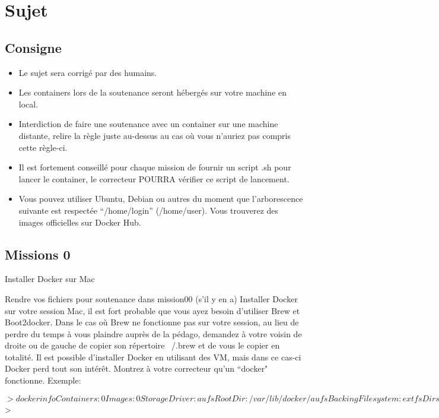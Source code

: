 \documentclass{42}
\begin{document}
\newpage

\chapter{Sujet}
\section{Consigne}
\begin{itemize}
	\item Le sujet sera corrigé par des humains.
	\item Les containers lors de la soutenance seront hébergés sur votre machine en local.
	\item Interdiction de faire une soutenance avec un container sur une machine distante, relire la règle juste au-dessus au cas où vous n’auriez pas compris cette règle-ci.
	\item Il est fortement conseillé pour chaque mission de fournir un script .sh pour lancer le container, le correcteur POURRA vérifier ce script de lancement.
	\item Vous pouvez utiliser Ubuntu, Debian ou autres du moment que l'arborescence suivante est respectée “/home/login” (/home/user). Vous trouverez des images officielles sur Docker Hub.
\end{itemize}

\newpage

\section{Missions 0}
{\Huge Installer Docker sur Mac}
\newline
\newline

Rendre vos fichiers pour soutenance dans mission00 (s’il y en a)
\newline
\newline
Installer Docker sur votre session Mac, il est fort probable que vous ayez besoin d’utiliser Brew et Boot2docker.
\newline
Dans le cas où Brew ne fonctionne pas sur votre session, au lieu de perdre du temps à vous plaindre auprès de la pédago, demandez à votre voisin de droite ou de gauche de copier son répertoire ~/.brew et de vous le copier en totalité.
\newline
Il est possible d’installer Docker en utilisant des VM, mais dans ce cas-ci Docker perd tout son intérêt.
\newline
\newline
Montrez à votre correcteur qu’un “docker" fonctionne.
\newline
Exemple:
\begin{42ccode}
$>docker info
Containers: 0
Images: 0
Storage Driver: aufs
 Root Dir: /var/lib/docker/aufs
 Backing Filesystem: extfs
 Dirs: 0
Execution Driver: native-0.2
Kernel Version: 3.16.0-30-generic
Operating System: Ubuntu 14.10
CPUs: 2
Total Memory: 3.633 GiB
Name: ubuntu
ID: PDDP:L64U:RQBT:G5ET:TEAC:XIJK:7JMR:ZVJW:NWU3:JMMD:YV36:WRUM
WARNING: No swap limit support
$>
\end{42ccode}
\end{document}
